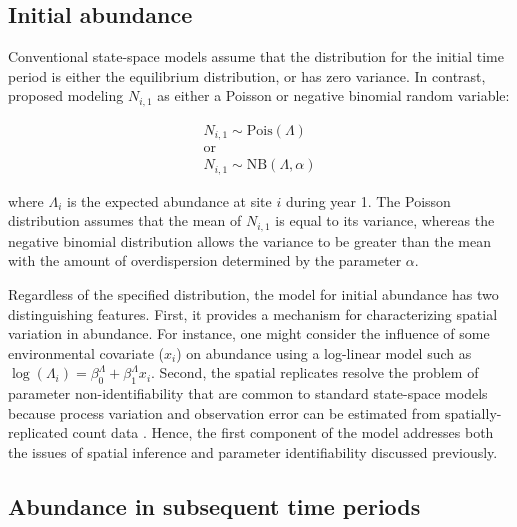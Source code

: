 \documentclass[12pt,english]{article}
\begin{document}
\begin{spacing}{1.9}
\begin{flushleft}
\subsection*{Initial abundance}

Conventional state-space models assume that the
distribution for the initial time period 
is either the equilibrium
distribution, or has zero variance.
In contrast, \citet{dail_madsen:2011} proposed modeling $N_{i,1}$
as either a Poisson or negative binomial random variable:
\begin{linenomath*}
\begin{gather}
N_{i,1} \sim \mathrm{Pois}(\Lambda) \nonumber \\
\text{or} \nonumber \\
N_{i,1} \sim \mathrm{NB}(\Lambda, \alpha)
\label{eq:N1}
\end{gather}
\end{linenomath*}
where $\Lambda_i$ is the expected abundance at site $i$ during
year 1.
The Poisson distribution assumes that the mean of $N_{i,1}$ is
equal to its variance, whereas the negative binomial distribution allows the
variance to be greater than the mean with the amount of
overdispersion determined by the parameter $\alpha$.

Regardless of the specified distribution, the model for initial
abundance has two distinguishing features. First, it provides a
mechanism for characterizing spatial variation in abundance. For
instance, one might consider the influence of some environmental
covariate ($x_i$) on abundance using a log-linear
model such as $\log(\Lambda_i) = \beta^{\Lambda}_0 +
\beta^{\Lambda}_1
x_{i}$. Second, the spatial
replicates resolve the
problem of parameter non-identifiability that are common to
standard state-space models because
process variation and observation error can be estimated from
spatially-replicated count data \citep{royle:2004biom}. Hence, the first component of
the model addresses both the issues of spatial inference and
parameter identifiability discussed previously.

\subsection*{Abundance in subsequent time periods}


\end{flushleft}
\end{spacing}
\end{document}
